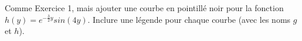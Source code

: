 \documentclass[%
oneside,                 %
final,                   %
10pt,french]{article}
\newenvironment{doconceexercise}{}{}
\newcounter{doconceexercisecounter}
\begin{document}
\begin{doconceexercise}



Comme Exercice 1, mais ajouter une courbe en pointillé noir pour la fonction $h(y) = e^{-\frac{3}{2}y} sin(4y)$. Inclure une légende pour chaque courbe (avec les noms $g$ et $h$).




% 
% 
% 
% 
% 
% 
% 
% 
\end{doconceexercise}


\end{document}
